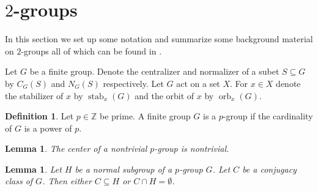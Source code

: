 \documentclass{dcthesis}
\newcommand{\ZZ}{\mathbb Z}
\newcommand{\defi}[1]{\textsf{#1}}
\newcommand{\mm}[1]{{\color{blue} \sf MM: [#1]}}
\DeclareMathOperator{\stab}{stab}
\DeclareMathOperator{\orb}{orb}
\numberwithin{equation}{section}
\newtheorem{lemma}[equation]{Lemma}
\theoremstyle{definition}
\newtheorem{definition}[equation]{Definition}
\theoremstyle{remark}
\begin{document}
{{  \section{$2$-groups}{\label{sec:twogroups}
    In this section we set up some notation
    and
    summarize some background material
    on $2$-groups all of which can be found
    in \cite[\S 6.1]{DF}.
    \par
    Let $G$ be a finite group.
    Denote the \defi{centralizer} and
    \defi{normalizer} of a subet $S\subseteq G$
    by $C_G(S)$ and $N_G(S)$ respectively.
    Let $G$ act on a set $X$.
    For $x\in X$
    denote the \defi{stabilizer of $x$} by
    $\stab_x(G)$
    and the \defi{orbit of $x$} by
    $\orb_x(G)$.
    \begin{definition}
      \label{def:pgroup}
      Let $p\in\ZZ$ be prime.
      A finite group $G$ is a
      \defi{$p$-group}
      if the cardinality of $G$
      is a power of $p$.
    \end{definition}
    \begin{lemma}
      \label{lem:pgrouphasacenter}
      The center of a nontrivial $p$-group is nontrivial.
    \end{lemma}
    \begin{lemma}
      \label{lem:conjugacyinsubgroups}
      Let $H$ be a normal subgroup of a $p$-group $G$.
      Let $C$ be a conjugacy class of $G$.
      Then either $C\subseteq H$ or $C\cap H = \emptyset$.

\end{lemma}}}}
\end{document}
